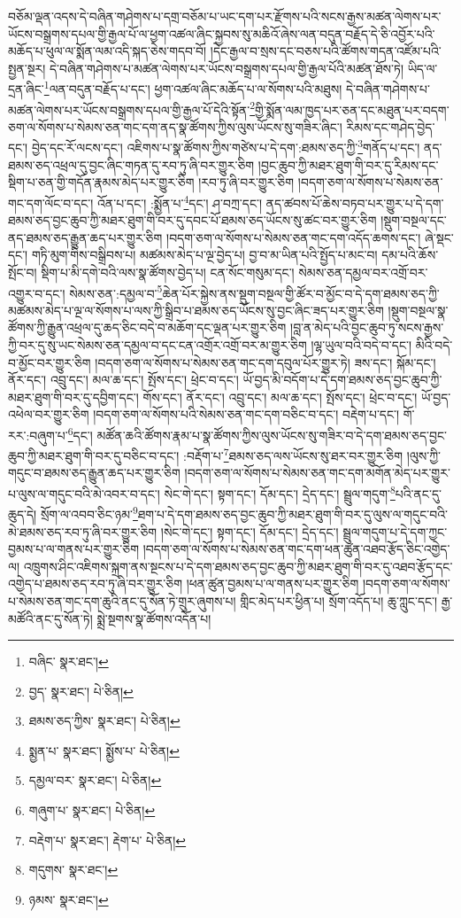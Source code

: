 བཅོམ་ལྡན་འདས་དེ་བཞིན་གཤེགས་པ་དགྲ་བཅོམ་པ་ཡང་དག་པར་རྫོགས་པའི་སངས་རྒྱས་མཚན་ལེགས་པར་ཡོངས་བསྒྲགས་དཔལ་གྱི་རྒྱལ་པོ་ལ་ཕྱག་འཚལ་ཞིང་སྐྱབས་སུ་མཆིའོ་ཞེས་ལན་བདུན་བརྗོད་དེ་ཅི་འབྱོར་པའི་མཆོད་པ་ཕུལ་ལ་སྨོན་ལམ་འདི་སྐད་ཅེས་གདབ་བོ། །དེང་རྒྱལ་བ་སྲས་དང་བཅས་པའི་ཚོགས་གདན་འཛོམ་པའི་སྤྱན་སྔར། དེ་བཞིན་གཤེགས་པ་མཚན་ལེགས་པར་ཡོངས་བསྒྲགས་དཔལ་གྱི་རྒྱལ་པོའི་མཚན་ཐོས་ཏེ། ཡིད་ལ་དྲན་ཞིང་\footnote{བཞིང་  སྣར་ཐང་། }ལན་བདུན་བརྗོད་པ་དང་། ཕྱག་འཚལ་ཞིང་མཆོད་པ་ལ་སོགས་པའི་མཐུས། དེ་བཞིན་གཤེགས་པ་མཚན་ལེགས་པར་ཡོངས་བསྒྲགས་དཔལ་གྱི་རྒྱལ་པོ་དེའི་སྟོན་\footnote{བྱད་  སྣར་ཐང་།  པེ་ཅིན། }གྱི་སྨོན་ལམ་ཁྱད་པར་ཅན་དང་མཐུན་པར་བདག་ཅག་ལ་སོགས་པ་སེམས་ཅན་གང་དག་ནད་སྣ་ཚོགས་ཀྱིས་ལུས་ཡོངས་སུ་གཟིར་ཞིང་། རིམས་དང་གཤེད་བྱེད་དང་། བྱེད་དང་རོ་ལངས་དང་། འཇིགས་པ་སྣ་ཚོགས་ཀྱིས་གཙེས་པ་དེ་དག་:ཐམས་ཅད་ཀྱི་\footnote{ཐམས་ཅད་ཀྱིས་  སྣར་ཐང་།  པེ་ཅིན། }གནོད་པ་དང་། ནད་ཐམས་ཅད་འཕྲལ་དུ་བྱང་ཞིང་གཏན་དུ་རབ་ཏུ་ཞི་བར་གྱུར་ཅིག །བྱང་ཆུབ་ཀྱི་མཐར་ཐུག་གི་བར་དུ་རིམས་དང་སྡིག་པ་ཅན་གྱི་གདོན་རྣམས་མེད་པར་གྱུར་ཅིག །རབ་ཏུ་ཞི་བར་གྱུར་ཅིག །བདག་ཅག་ལ་སོགས་པ་སེམས་ཅན་གང་དག་ལོང་བ་དང་། འོན་པ་དང་། :སྨྱོན་པ་\footnote{སྨྱན་པ་  སྣར་ཐང་། སྨྱོས་པ་  པེ་ཅིན། }དང་། ཤ་བཀྲ་དང་། ནད་ཚབས་པོ་ཆེས་བཏབ་པར་གྱུར་པ་དེ་དག་ཐམས་ཅད་བྱང་ཆུབ་ཀྱི་མཐར་ཐུག་གི་བར་དུ་དབང་པོ་ཐམས་ཅད་ཡོངས་སུ་ཚང་བར་གྱུར་ཅིག །སྡུག་བསྔལ་དང་ནད་ཐམས་ཅད་རྒྱུན་ཆད་པར་གྱུར་ཅིག །བདག་ཅག་ལ་སོགས་པ་སེམས་ཅན་གང་དག་འདོད་ཆགས་དང་། ཞེ་སྡང་དང་། གཏི་མུག་གིས་བསྒྲིབས་པ། མཚམས་མེད་པ་ལྔ་བྱེད་པ། བྱ་བ་མ་ཡིན་པའི་སྤྱོད་པ་མང་བ། དམ་པའི་ཆོས་སྤོང་བ། སྡིག་པ་མི་དགེ་བའི་ལས་སྣ་ཚོགས་བྱེད་པ། ངན་སོང་གསུམ་དང་། སེམས་ཅན་དམྱལ་བར་འགྲོ་བར་འགྱུར་བ་དང་། སེམས་ཅན་:དམྱལ་བ་\footnote{དམྱལ་བར་  སྣར་ཐང་།  པེ་ཅིན། }ཆེན་པོར་སྐྱེས་ནས་སྡུག་བསྔལ་གྱི་ཚོར་བ་མྱོང་བ་དེ་དག་ཐམས་ཅད་ཀྱི་མཚམས་མེད་པ་ལྔ་ལ་སོགས་པ་ལས་ཀྱི་སྒྲིབ་པ་ཐམས་ཅད་ཡོངས་སུ་བྱང་ཞིང་ཟད་པར་གྱུར་ཅིག །སྡུག་བསྔལ་སྣ་ཚོགས་ཀྱི་རྒྱུན་འཕྲལ་དུ་ཆད་ཅིང་བདེ་བ་མཆོག་དང་ལྡན་པར་གྱུར་ཅིག །བླ་ན་མེད་པའི་བྱང་ཆུབ་ཏུ་སངས་རྒྱས་ཀྱི་བར་དུ་སུ་ཡང་སེམས་ཅན་དམྱལ་བ་དང་ངན་འགྲོར་འགྲོ་བར་མ་གྱུར་ཅིག །ལྷ་ཡུལ་བའི་བདེ་བ་དང་། མིའི་བདེ་བ་མྱོང་བར་གྱུར་ཅིག །བདག་ཅག་ལ་སོགས་པ་སེམས་ཅན་གང་དག་དབུལ་པོར་གྱུར་ཏེ། ཟས་དང་། སྐོམ་དང་། ནོར་དང་། འབྲུ་དང་། མལ་ཆ་དང་། སྤོས་དང་། ཕྲེང་བ་དང་། ཡོ་བྱད་མི་བདོག་པ་དེ་དག་ཐམས་ཅད་བྱང་ཆུབ་ཀྱི་མཐར་ཐུག་གི་བར་དུ་དབྱིག་དང་། གོས་དང་། ནོར་དང་། འབྲུ་དང་། མལ་ཆ་དང་། སྤོས་དང་། ཕྲེང་བ་དང་། ཡོ་བྱད་འཕེལ་བར་གྱུར་ཅིག །བདག་ཅག་ལ་སོགས་པའི་སེམས་ཅན་གང་དག་བཅིང་བ་དང་། བརྡེག་པ་དང་། གོ་རར་:བཞུག་པ་\footnote{གཞུག་པ་  སྣར་ཐང་།  པེ་ཅིན། }དང་། མཚོན་ཆའི་ཚོགས་རྣམ་པ་སྣ་ཚོགས་ཀྱིས་ལུས་ཡོངས་སུ་གཟིར་བ་དེ་དག་ཐམས་ཅད་བྱང་ཆུབ་ཀྱི་མཐར་ཐུག་གི་བར་དུ་བཅིང་བ་དང་། :བརྡོག་པ་\footnote{བརྡེག་པ་  སྣར་ཐང་། རྡེག་པ་  པེ་ཅིན། }ཐམས་ཅད་ལས་ཡོངས་སུ་ཐར་བར་གྱུར་ཅིག །ལུས་ཀྱི་གདུང་བ་ཐམས་ཅད་རྒྱུན་ཆད་པར་གྱུར་ཅིག །བདག་ཅག་ལ་སོགས་པ་སེམས་ཅན་གང་དག་མགོན་མེད་པར་གྱུར་པ་ལུས་ལ་གདུང་བའི་མེ་འབར་བ་དང་། སེང་གེ་དང་། སྟག་དང་། དོམ་དང་། དྲེད་དང་། སྦྲུལ་གདུག་\footnote{གདུགས་  སྣར་ཐང་། }པའི་ནང་དུ་ཆུད་དེ། སྲོག་ལ་འབབ་ཅིང་ཉམ་\footnote{ཉམས་  སྣར་ཐང་། }ཐག་པ་དེ་དག་ཐམས་ཅད་བྱང་ཆུབ་ཀྱི་མཐར་ཐུག་གི་བར་དུ་ལུས་ལ་གདུང་བའི་མེ་ཐམས་ཅད་རབ་ཏུ་ཞི་བར་གྱུར་ཅིག །སེང་གེ་དང་། སྟག་དང་། དོམ་དང་། དྲེད་དང་། སྦྲུལ་གདུག་པ་དེ་དག་ཀྱང་བྱམས་པ་ལ་གནས་པར་གྱུར་ཅིག །བདག་ཅག་ལ་སོགས་པ་སེམས་ཅན་གང་དག་ཕན་ཚུན་འཐབ་རྩོད་ཅིང་འགྱེད་ལ། འཁྲུགས་ཤིང་འཇིགས་སྐྲག་ནས་སྔངས་པ་དེ་དག་ཐམས་ཅད་བྱང་ཆུབ་ཀྱི་མཐར་ཐུག་གི་བར་དུ་འཐབ་རྩོད་དང་འགྱེད་པ་ཐམས་ཅད་རབ་ཏུ་ཞི་བར་གྱུར་ཅིག །ཕན་ཚུན་བྱམས་པ་ལ་གནས་པར་གྱུར་ཅིག །བདག་ཅག་ལ་སོགས་པ་སེམས་ཅན་གང་དག་ཆུའི་ནང་དུ་སོན་ཏེ་གྲུར་ཞུགས་པ། གླིང་མེད་པར་ཕྱིན་པ། སྲོག་འདོད་པ། ཆུ་ཀླུང་དང་། རྒྱ་མཚོའི་ནང་དུ་སོན་ཏེ། སྨྲེ་སྔགས་སྣ་ཚོགས་འདོན་པ། 